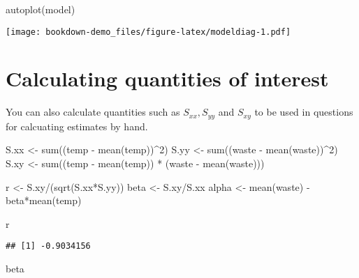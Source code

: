 \documentclass[
]{book}
\newenvironment{Shaded}{\begin{snugshade}}{\end{snugshade}}
\newcommand{\DecValTok}[1]{\textcolor[rgb]{0.00,0.00,0.81}{#1}}
\newcommand{\FunctionTok}[1]{\textcolor[rgb]{0.00,0.00,0.00}{#1}}
\newcommand{\NormalTok}[1]{#1}
\newcommand{\OtherTok}[1]{\textcolor[rgb]{0.56,0.35,0.01}{#1}}
\newcommand{\SpecialCharTok}[1]{\textcolor[rgb]{0.00,0.00,0.00}{#1}}
\begin{document}
\begin{Shaded}
\begin{Highlighting}[]
\FunctionTok{autoplot}\NormalTok{(model)}
\end{Highlighting}
\end{Shaded}

\texttt{[image: bookdown-demo\_files/figure-latex/modeldiag-1.pdf]}

\hypertarget{calculating-quantities-of-interest}{%
\section{Calculating quantities of interest}\label{calculating-quantities-of-interest}}

You can also calculate quantities such as \(S_{xx}, S_{yy}\) and \(S_{xy}\) to be used in questions for calcuating estimates by hand.

\begin{Shaded}
\begin{Highlighting}[]
\NormalTok{S.xx }\OtherTok{\textless{}{-}} \FunctionTok{sum}\NormalTok{((temp }\SpecialCharTok{{-}} \FunctionTok{mean}\NormalTok{(temp))}\SpecialCharTok{\^{}}\DecValTok{2}\NormalTok{)}
\NormalTok{S.yy }\OtherTok{\textless{}{-}} \FunctionTok{sum}\NormalTok{((waste }\SpecialCharTok{{-}} \FunctionTok{mean}\NormalTok{(waste))}\SpecialCharTok{\^{}}\DecValTok{2}\NormalTok{)}
\NormalTok{S.xy }\OtherTok{\textless{}{-}} \FunctionTok{sum}\NormalTok{((temp }\SpecialCharTok{{-}} \FunctionTok{mean}\NormalTok{(temp)) }\SpecialCharTok{*}\NormalTok{ (waste }\SpecialCharTok{{-}} \FunctionTok{mean}\NormalTok{(waste)))}

\NormalTok{r }\OtherTok{\textless{}{-}}\NormalTok{ S.xy}\SpecialCharTok{/}\NormalTok{(}\FunctionTok{sqrt}\NormalTok{(S.xx}\SpecialCharTok{*}\NormalTok{S.yy))}
\NormalTok{beta }\OtherTok{\textless{}{-}}\NormalTok{ S.xy}\SpecialCharTok{/}\NormalTok{S.xx}
\NormalTok{alpha }\OtherTok{\textless{}{-}} \FunctionTok{mean}\NormalTok{(waste) }\SpecialCharTok{{-}}\NormalTok{ beta}\SpecialCharTok{*}\FunctionTok{mean}\NormalTok{(temp)}

\NormalTok{r}
\end{Highlighting}
\end{Shaded}

\begin{verbatim}
## [1] -0.9034156
\end{verbatim}

\begin{Shaded}
\begin{Highlighting}[]
\NormalTok{beta}
\end{Highlighting}
\end{Shaded}
\end{document}
